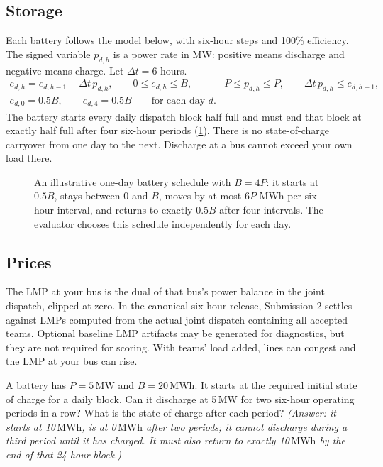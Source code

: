\documentclass[10pt]{article}
\newcommand{\MW}{\ensuremath{\,\mathrm{MW}}}
\newcommand{\MWh}{\ensuremath{\,\mathrm{MWh}}}
\begin{document}
\subsection{Storage}
Each battery follows the model below, with six-hour steps and 100\% efficiency.
The signed variable $p_{d,h}$ is a power rate in MW: positive means discharge
and negative means charge. Let $\Delta t=6$ hours.
\begin{gather*}
  e_{d,h} = e_{d,h-1} - \Delta t\,p_{d,h}, \qquad 0 \le e_{d,h} \le B, \qquad -P \le p_{d,h} \le P, \qquad \Delta t\,p_{d,h} \le e_{d,h-1},\\
  e_{d,0} = 0.5B, \qquad e_{d,4} = 0.5B \qquad \text{for each day }d.
\end{gather*}
The battery starts every daily dispatch block half full and must end that block
at exactly half full after four six-hour periods (\cref{fig:soc}). There is no state-of-charge carryover
from one day to the next. Discharge at a bus cannot exceed your own load there.

\begin{figure}[htbp]
  \centering
  
  \caption{An illustrative one-day battery schedule with $B = 4P$: it starts
  at $0.5B$, stays between $0$ and $B$, moves by at most $6P$ MWh per
  six-hour interval, and returns to exactly $0.5B$ after four intervals. The evaluator
  chooses this schedule independently for each day.}
  \label{fig:soc}
\end{figure}

\subsection{Prices}
The LMP at your bus is the dual of that bus's power balance in the joint
dispatch, clipped at zero. In the canonical six-hour release, Submission 2
settles against LMPs computed from the actual joint dispatch containing all
accepted teams. Optional baseline LMP artifacts may be generated for
diagnostics, but they are not required for scoring. With teams' load added,
lines can congest and the LMP at your bus can rise.

\begin{exercisebox}
A battery has $P = 5\MW$ and $B = 20\MWh$. It starts at the required initial
state of charge for a daily block. Can it discharge at 5\MW{} for two
six-hour operating periods in a row? What is the state of charge after each
period? \emph{(Answer: it starts at 10\MWh, is at 0\MWh{} after two periods;
it cannot discharge during a third period until it has charged. It must also
return to exactly 10\MWh{} by the end of that 24-hour block.)}
\end{exercisebox}
\end{document}
